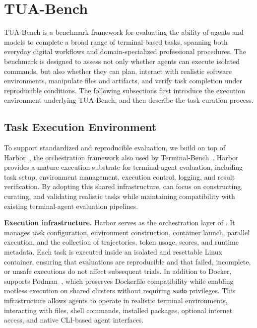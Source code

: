 \section{TUA-Bench}\label{sec:tua-bench}
TUA-Bench is a benchmark framework for evaluating the ability of agents and models to complete a broad range of terminal-based tasks, spanning both everyday digital workflows and domain-specialized professional procedures. The benchmark is designed to assess not only whether agents can execute isolated commands, but also whether they can plan, interact with realistic software environments, manipulate files and artifacts, and verify task completion under reproducible conditions. The following subsections first introduce the execution environment underlying TUA-Bench, and then describe the task curation process.

\subsection{Task Execution Environment}\label{sec:task-env}

To support standardized and reproducible evaluation, we build \benchname on top of Harbor~\citep{Harbor_Framework}, the orchestration framework also used by Terminal-Bench~\citep{merrill2026terminalbench}. Harbor provides a mature execution substrate for terminal-agent evaluation, including task setup, environment management, execution control, logging, and result verification. By adopting this shared infrastructure, \benchname can focus on constructing, curating, and validating realistic tasks while maintaining compatibility with existing terminal-agent evaluation pipelines.

\noindent\textbf{Execution infrastructure.}
Harbor serves as the orchestration layer of \benchname. It manages task configuration, environment construction, container launch, parallel execution, and the collection of trajectories, token usage, scores, and runtime metadata. Each task is executed inside an isolated and resettable Linux container, ensuring that evaluations are reproducible and that failed, incomplete, or unsafe executions do not affect subsequent trials. In addition to Docker, \benchname supports Podman~\citep{podman2026}, which preserves Dockerfile compatibility while enabling rootless execution on shared clusters without requiring \texttt{sudo} privileges. This infrastructure allows agents to operate in realistic terminal environments, interacting with files, shell commands, installed packages, optional internet access, and native CLI-based agent interfaces.

